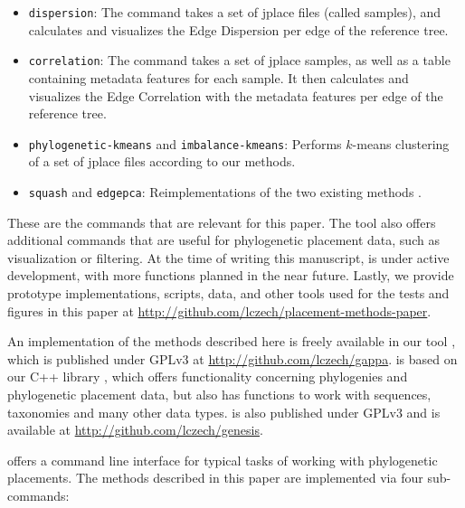\begin{itemize}
    \item \texttt{dispersion}: The command takes a set of jplace files (called samples), and calculates and visualizes
        the Edge Dispersion per edge of the reference tree.
    \item \texttt{correlation}: The command takes a set of jplace samples, as well as a table containing metadata
        features for each sample. It then calculates and visualizes the Edge Correlation with the metadata features per
        edge of the reference tree.
    \item \texttt{phylogenetic-kmeans} and \texttt{imbalance-kmeans}: Performs $k$-means clustering of a set of jplace
        files according to our methods.
    \item \texttt{squash} and \texttt{edgepca}: Reimplementations of the two existing methods \cite{Matsen2011a,Evans2012}.
\end{itemize}

These are the  commands that are relevant for this paper.
The tool also offers additional commands that are useful for phylogenetic placement data, such as visualization or filtering.
At the time of writing this manuscript,  is under active development,
with more functions planned in the near future.
Lastly, we provide prototype implementations, scripts, data, and other tools
used for the tests and figures in this paper at \url{http://github.com/lczech/placement-methods-paper}.



An implementation of the methods described here is freely available in our tool ,
which is published under GPLv3 at \url{http://github.com/lczech/gappa}.
 is based on our C++ library ,
which offers functionality concerning phylogenies and phylogenetic placement data,
but also has functions to work with sequences, taxonomies and many other data types.
 is also published under GPLv3 and is available at \url{http://github.com/lczech/genesis}.

 offers a command line interface for typical tasks of working with phylogenetic placements.
The methods described in this paper are implemented via four sub-commands:

